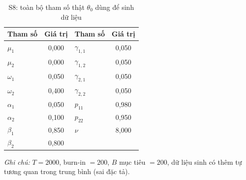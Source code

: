 \documentclass[11pt,a4paper]{article}
\begin{document}
\begin{table}[H]\centering\small
\caption{S8: toàn bộ tham số thật $\theta_0$ dùng để sinh dữ liệu}
\begin{tabularx}{\textwidth}{l C  l C}
\toprule
\textbf{Tham số} & \textbf{Giá trị} & \textbf{Tham số} & \textbf{Giá trị} \\
\midrule
$\mu_1$ & 0{,}000 & $\gamma_{1,1}$ & 0{,}050 \\
$\mu_2$ & 0{,}000 & $\gamma_{1,2}$ & 0{,}050 \\
$\omega_1$ & 0{,}050 & $\gamma_{2,1}$ & 0{,}050 \\
$\omega_2$ & 0{,}400 & $\gamma_{2,2}$ & 0{,}050 \\
$\alpha_1$ & 0{,}050 & $p_{11}$ & 0{,}980 \\
$\alpha_2$ & 0{,}100 & $p_{22}$ & 0{,}950 \\
$\beta_1$ & 0{,}850 & $\nu$ & 8{,}000 \\
$\beta_2$ & 0{,}800 & & \\
\bottomrule
\end{tabularx}
\vspace{0.2em}\raggedright\scriptsize \emph{Ghi chú:} $T=2000$, burn-in $=200$, $B$ mục tiêu $=200$, dữ liệu sinh có thêm tự tương quan trong trung bình (sai đặc tả).
\end{table}
\end{document}
